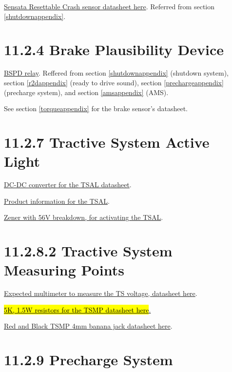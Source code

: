 \documentclass{article}
\DeclareRobustCommand{\hlr}[1]{{\sethlcolor{red}\hl{#1}}}
\begin{document}
\href{http://www.sensata.com/download/resettable-crash.pdf}{Sensata Resettable Crash sensor datasheet here}. Referred from section \ref{shutdownappendix}.

\section*{11.2.4 Brake Plausibility Device} \label{bspdappendix}

\href{http://www.te.com/commerce/DocumentDelivery/DDEController?Action=srchrtrv&DocNm=PB&DocType=DS&DocLang=English}{BSPD relay}. Reffered from section \ref{shutdownappendix} (shutdown system), section \ref{r2dappendix} (ready to drive sound), section \ref{prechargeappendix} (precharge system), and section \ref{amsappendix} (AMS). 

See section \ref{torqueappendix} for the brake sensor's datasheet. 

\section*{11.2.7 Tractive System Active Light}

\href{http://www.mouser.com/ds/2/281/mdc_ruw15-217876.pdf}{DC-DC converter for the TSAL datasheet}.

\href{https://www.superbrightleds.com/moreinfo/oval-marker-lamps/oval-led-truck-trailer-light-with-reflectorized-lens-4in-led-marker-clearance-light-with-4-leds/580/#/tab/Specifications}{Product information for the TSAL}.

\href{http://www.onsemi.com/pub_link/Collateral/1N5333B-D.PDF}{Zener with 56V breakdown, for activating the TSAL}.

\section*{11.2.8.2 Tractive System Measuring Points} \label{tsmpappendix}

\href{https://www.gossenmetrawatt.com/resources/tt/hit27/db_gb.pdf}{Expected multimeter to measure the TS voltage, datasheet here}.

\href{http://www.mouser.com/ds/2/427/cmfind-239942.pdf}{\hlr{5K, 1.5W resistors for the TSMP datasheet here}.}

\href{http://www.mouser.com/ds/2/159/D72930_02_10_06-21562.pdf}{Red and Black TSMP 4mm banana jack datasheet here}.

\section*{11.2.9 Precharge System} 
\label{prechargeappendix}
\end{document}
